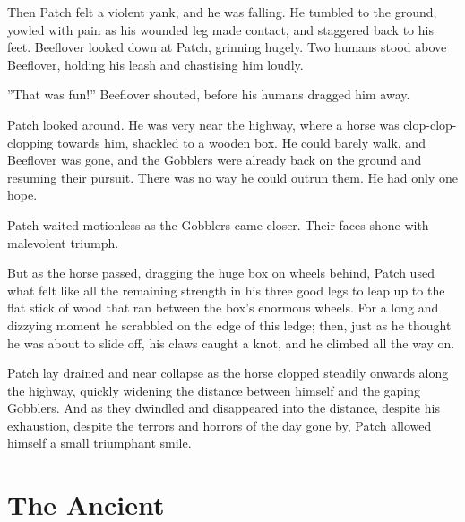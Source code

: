 \documentclass[12pt]{book}
\begin{document}
 Then Patch felt a violent yank, and he was falling. He tumbled to the ground, yowled with pain as his wounded leg made contact, and staggered back to his feet. Beeflover looked down at Patch, grinning hugely. Two humans stood above Beeflover, holding his leash and chastising him loudly.\par
 ''That was fun!'' Beeflover shouted, before his humans dragged him away.\par
 Patch looked around. He was very near the highway, where a horse was clop-clop-clopping towards him, shackled to a wooden box. He could barely walk, and Beeflover was gone, and the Gobblers were already back on the ground and resuming their pursuit. There was no way he could outrun them. He had only one hope.\par
 Patch waited motionless as the Gobblers came closer. Their faces shone with malevolent triumph.\par
 But as the horse passed, dragging the huge box on wheels behind, Patch used what felt like all the remaining strength in his three good legs to leap up to the flat stick of wood that ran between the box's enormous wheels. For a long and dizzying moment he scrabbled on the edge of this ledge; then, just as he thought he was about to slide off, his claws caught a knot, and he climbed all the way on.\par
 Patch lay drained and near collapse as the horse clopped steadily onwards along the highway, quickly widening the distance between himself and the gaping Gobblers. And as they dwindled and disappeared into the distance, despite his exhaustion, despite the terrors and horrors of the day gone by, Patch allowed himself a small triumphant smile.\par

\section{The Ancient}
\end{document}
